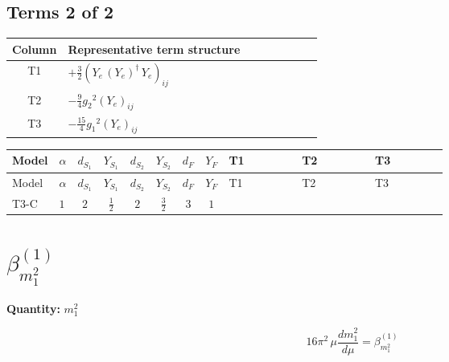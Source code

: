 \documentclass[8pt]{article}
\begin{document}
\begin{landscape}
\subsection*{Terms 2 of 2}
\begin{center}
\begin{tabular}{@{}c >{\raggedright\arraybackslash}p{0.82\linewidth}@{}}
\toprule
Column & Representative term structure \\
\midrule
T1 & \(\displaystyle +\frac{3}{2} \left({Y_e}\,\left({Y_e}\right)^{\dagger}\,{Y_e}\right)_{ij}\) \\
\midrule
T2 & \(\displaystyle -\frac{9}{4} {g_2}^2 \left({Y_e}\right)_{ij}\) \\
\midrule
T3 & \(\displaystyle -\frac{15}{4} {g_1}^2 \left({Y_e}\right)_{ij}\) \\
\midrule
\bottomrule
\end{tabular}
\end{center}
\smallskip
\tiny
\begin{longtable}{@{}llcccccc >{\raggedright\arraybackslash}p{0.21\linewidth} >{\raggedright\arraybackslash}p{0.21\linewidth} >{\raggedright\arraybackslash}p{0.21\linewidth}@{}}
\toprule
Model & $\alpha$ & $d_{S_1}$ & $Y_{S_1}$ & $d_{S_2}$ & $Y_{S_2}$ & $d_F$ & $Y_F$ & T1 & T2 & T3 \\
\midrule
\endfirsthead
\toprule
Model & $\alpha$ & $d_{S_1}$ & $Y_{S_1}$ & $d_{S_2}$ & $Y_{S_2}$ & $d_F$ & $Y_F$ & T1 & T2 & T3 \\
\midrule
\endhead
T3-C & $1$ & $2$ & $\frac{1}{2}$ & $2$ & $\frac{3}{2}$ & $3$ & $1$ & \scriptsize\adjustbox{max width=\linewidth}{$\begin{gathered} +\frac{3}{2} \left({Y_e}\,\left({Y_e}\right)^{\dagger}\,{Y_e}\right)_{ij}\end{gathered}$} & \scriptsize\adjustbox{max width=\linewidth}{$\begin{gathered} -\frac{9}{4} {g_2}^2 \left({Y_e}\right)_{ij}\end{gathered}$} & \scriptsize\adjustbox{max width=\linewidth}{$\begin{gathered} -\frac{15}{4} {g_1}^2 \left({Y_e}\right)_{ij}\end{gathered}$} \\
\midrule
\bottomrule
\end{longtable}
\clearpage
\section*{$\beta_{m_1^2}^{(1)}$}
\noindent\textbf{Quantity: }$m_1^2$\par\smallskip
\[16\pi^2\,\mu\frac{d m_1^2}{d\mu}=\beta_{m_1^2}^{(1)}\]

\end{landscape}
\end{document}
